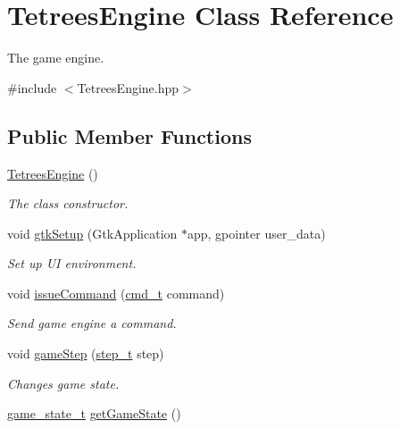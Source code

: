 \hypertarget{classTetreesEngine}{}\section{Tetrees\+Engine Class Reference}
\label{classTetreesEngine}


The game engine.  




{\ttfamily \#include $<$Tetrees\+Engine.\+hpp$>$}

\subsection*{Public Member Functions}
\begin{DoxyCompactItemize}
\item 
\mbox{\hyperlink{classTetreesEngine_ada1775237223604c895a50625eda1d49}{Tetrees\+Engine}} ()
\begin{DoxyCompactList}\small\item\em The class constructor. \end{DoxyCompactList}\item 
void \mbox{\hyperlink{classTetreesEngine_a85e0da200fb3e17745f1978d24acca2f}{gtk\+Setup}} (Gtk\+Application $\ast$app, gpointer user\+\_\+data)
\begin{DoxyCompactList}\small\item\em Set up UI environment. \end{DoxyCompactList}\item 
void \mbox{\hyperlink{classTetreesEngine_aa2a283d09b0b6ab7c03ea2265a2e3438}{issue\+Command}} (\mbox{\hyperlink{TetreesDefs_8hpp_aadc337e2620d6621659e63e87c45e79d}{cmd\+\_\+t}} command)
\begin{DoxyCompactList}\small\item\em Send game engine a command. \end{DoxyCompactList}\item 
void \mbox{\hyperlink{classTetreesEngine_a33e9983a618b3538640b6bd987304b8b}{game\+Step}} (\mbox{\hyperlink{TetreesDefs_8hpp_a4d5a793092a473f85b4c1f7faf62afed}{step\+\_\+t}} step)
\begin{DoxyCompactList}\small\item\em Changes game state. \end{DoxyCompactList}\item 
\mbox{\hyperlink{TetreesDefs_8hpp_aebae08b2e3a36f1452b33acaf1eaab40}{game\+\_\+state\+\_\+t}} \mbox{\hyperlink{classTetreesEngine_a36e231a33457f87875f19d308984b0b8}{get\+Game\+State}} ()

\end{DoxyCompactItemize}
